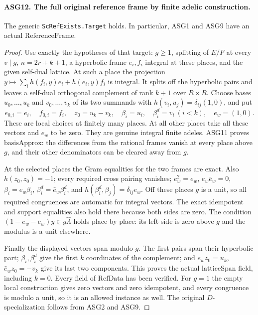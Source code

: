 \documentclass[11pt,a4paper]{article}
\numberwithin{equation}{section}
\theoremstyle{remark}\newtheorem{remark}[theorem]{Remark}
\begin{document}
\paragraph{ASG12. The full original reference frame by finite adelic construction.}
\label{claim:ASG12}
The generic \texttt{Sc\allowbreak Ref\allowbreak Exists.\allowbreak Target} holds.  In particular,
ASG1 and ASG9 have an actual \(\mathrm{ReferenceFrame}\).
\begin{proof}
Use exactly the hypotheses of that target: \(g\ge1\), splitting
of \(E/F\) at every \(v\mid g\), \(n=2r+k+1\), a
hyperbolic frame \(e_i,f_i\) integral at these places, and the
given self-dual lattice.  At such a place the projection
\(y\mapsto\sum_i h(f_i,y)e_i+h(e_i,y)f_i\) is integral.
It splits off the hyperbolic pairs and leaves a self-dual orthogonal
complement of rank \(k+1\) over \(R\times R\).
Choose bases \(u_0,\ldots,u_k\) and \(v_0,\ldots,v_k\)
of its two summands with
\(h(v_i,u_j)=\delta_{ij}(1,0)\), and put
\[
 e_{0,i}=e_i,\quad f_{0,i}=f_i,\quad z_0=u_k-v_k,
 \quad \beta_i=u_i,\quad\beta_i^d=v_i\ (i<k),
 \quad e_w=(1,0).
\tag{ASG.11}
\]
These are local choices at finitely many places.  At all other places
take all these vectors and \(e_w\) to be zero.  They are genuine
integral finite adeles.  ASG11 proves \(\mathrm{basisApprox}\):
the differences from the rational frames vanish at every place above
\(g\), and their other denominators can be cleared away from \(g\).

At the selected places the Gram equalities for the two frames are
exact.  Also \(h(z_0,z_0)=-1\); every required cross pairing
vanishes; \(e_w^2=e_w\), \(e_w\bar e_w=0\),
\(\beta_i=e_w\beta_i\),
\(\beta_i^d=\bar e_w\beta_i^d\), and
\(h(\beta_i^d,\beta_j)=\delta_{ij}e_w\).
Off these places \(g\) is a unit, so all required congruences
are automatic for integral vectors.  The exact idempotent and support
equalities also hold there because both sides are zero.
The condition \((1-e_w-\bar e_w)y\in g\widehat\Lambda\)
holds place by place: its left side is zero above \(g\) and
the modulus is a unit elsewhere.

Finally the displayed vectors span modulo \(g\).
The first pairs span their hyperbolic part; \(\beta_i,\beta_i^d\)
give the first \(k\) coordinates of the complement; and
\(e_w z_0=u_k\), \(\bar e_w z_0=-v_k\) give its last two
components.  This proves the actual \(\mathrm{latticeSpan}\)
field, including \(k=0\).  Every field of \(\mathrm{RefData}\)
has been verified.  For \(g=1\) the empty local construction gives
zero vectors and zero idempotent, and every congruence is modulo a unit,
so it is an allowed instance as well.
The original \(D\)-specialization follows from ASG2 and ASG9.
\end{proof}
\end{document}
